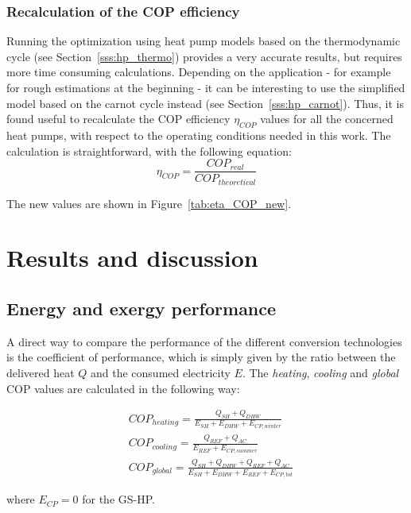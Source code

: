 \documentclass{article}
\begin{document}
\subsubsection{Recalculation of the COP efficiency}
Running the optimization using heat pump models based on the thermodynamic cycle (see Section~\ref{sss:hp_thermo}) provides a very accurate results, but requires more time consuming calculations. Depending on the application - for example for rough estimations at the beginning - it can be interesting to use the simplified model based on the carnot cycle instead (see Section~\ref{sss:hp_carnot}). Thus, it is found useful to recalculate the COP efficiency $\eta_{COP}$ values for all the concerned heat pumps, with respect to the operating conditions needed in this work. The calculation is straightforward, with the following equation:
\begin{equation}
\eta_{COP} = \frac{COP_{real}}{COP_{theoretical}}
\end{equation}



The new values are shown in Figure~\ref{tab:eta_COP_new}.


\newpage
\section{Results and discussion}

\subsection{Energy and exergy performance}\label{ss:perf}
A direct way to compare the performance of the different conversion technologies is the coefficient of performance, which is simply given by the ratio between the delivered heat $Q$ and the consumed electricity $E$. The \textit{heating}, \textit{cooling} and \textit{global} COP values are calculated in the following way:

\begin{align}
& COP_{heating} = \frac{Q_{SH}+ Q_{DHW}}{E_{SH} + E_{DHW} + E_{CP,winter}} \\
& COP_{cooling} = \frac{Q_{REF} + Q_{AC}}{E_{REF} + E_{CP,summer}} \\
& COP_{global} = \frac{Q_{SH}+ Q_{DHW} + Q_{REF} + Q_{AC}}{E_{SH} + E_{DHW} + E_{REF} + E_{CP,tot}}
\end{align}

where $E_{CP} = 0$ for the GS-HP. 
\end{document}
